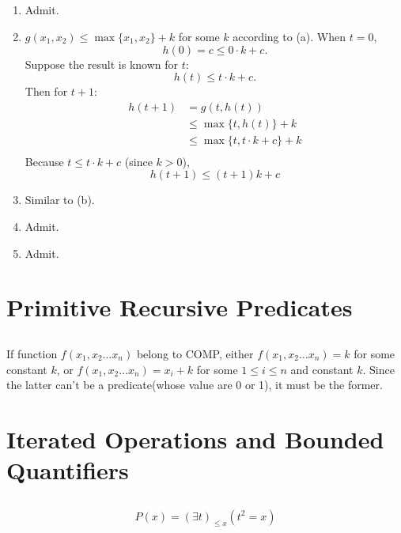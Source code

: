 \subsection{}
\begin{enumerate}
  \item Admit.

  \item
  $ g(x_{1}, x_{2}) \le \max\{x_{1}, x_{2}\} + k $ for some $k$ according to (a).
  When $ t = 0 $,
  \[ h(0) = c \le 0 \cdot k + c .\]
  Suppose the result is known for $ t $:
  \[ h(t) \le t \cdot k + c .\]
  Then for $ t+1 $:
  \begin{align*}
    h(t+1) & = g(t, h(t)) \\
           & \le \max\{t, h(t)\} + k \\
           & \le \max\{t, t \cdot k + c\} + k \\
  \end{align*}
  Because $ t \le t \cdot k + c $ (since $k>0$),
  \[ h(t+1) \le (t+1)k+c \]

  \item Similar to (b).
  \item Admit.
  \item Admit.
\end{enumerate}



\section{Primitive Recursive Predicates}

\subsection{}
If function $f(x_{1}, x_{2} \dots x_{n})$ belong to COMP,
either $f(x_{1}, x_{2} \dots x_{n}) = k$ for some constant $k$,
or $f(x_{1}, x_{2} \dots x_{n}) = x_{i}+k$ for some $1\le i\le n$ and constant $k$.
Since the latter can't be a predicate(whose value are 0 or 1), it must be the former.



\section{Iterated Operations and Bounded Quantifiers}

\subsection{}
\[ P(x) = (\exists t)_{\le x}(t^{2}=x) \]

